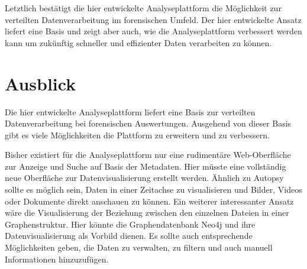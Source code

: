 \noindent
Letztlich bestätigt die hier entwickelte Analyseplattform die Möglichkeit zur verteilten Datenverarbeitung im forensischen Umfeld. Der hier entwickelte Ansatz liefert eine Basis und zeigt aber auch, wie die Analyseplattform verbessert werden kann um zukünftig schneller und effizienter Daten verarbeiten zu können.\\


\chapter{Ausblick}
\label{ch:ausblick}

Die hier entwickelte Analyseplattform liefert eine Basis zur verteilten Datenverarbeitung bei forensischen Auswertungen. Ausgehend von dieser Basis gibt es viele Möglichkeiten die Plattform zu erweitern und zu verbessern.

Bisher existiert für die Analyseplattform nur eine rudimentäre Web-Oberfläche zur Anzeige und Suche auf Basis der Metadaten. Hier müsste eine vollständig neue Oberfläche zur Datenvisualisierung erstellt werden. Ähnlich zu Autopsy sollte es möglich sein, Daten in einer Zeitachse zu visualisieren und Bilder, Videos oder Dokumente direkt anschauen zu können. Ein weiterer interessanter Ansatz wäre die Visualisierung der Beziehung zwischen den einzelnen Dateien in einer Graphenstruktur. Hier könnte die Graphendatenbank Neo4j und ihre Datenvisualisierung als Vorbild dienen. Es sollte auch entsprechende Möglichkeiten geben, die Daten zu verwalten, zu filtern und auch manuell Informationen hinzuzufügen.\\

